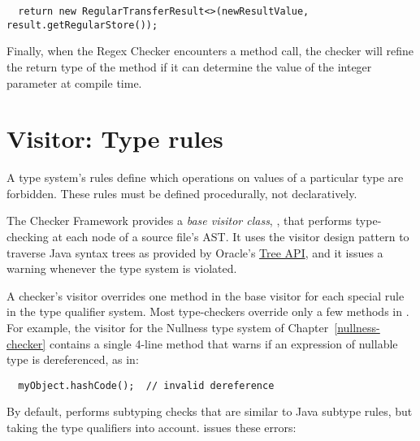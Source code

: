 \begin{enumerate}
\begin{smaller}
\begin{Verbatim}
  return new RegularTransferResult<>(newResultValue, result.getRegularStore());
\end{Verbatim}
\end{smaller}

Finally, when the Regex Checker encounters a  method
call, the checker will refine the return type of the method if it can determine
the value of the integer parameter at compile time.

\end{enumerate}


\section{Visitor: Type rules\label{extending-visitor}}

A type system's rules define which operations on values of a
particular type are forbidden.
These rules must be defined procedurally, not declaratively.

The Checker Framework provides a \textit{base visitor class},
, that performs type-checking at each node of a
source file's AST\@.  It uses the visitor design pattern to traverse
Java syntax trees as provided by Oracle's
\href{http://docs.oracle.com/javase/8/docs/jdk/api/javac/tree/}{Tree
API},
and it issues a warning whenever the type system is violated.

A checker's visitor overrides one method in the base visitor for each special
rule in the type qualifier system.  Most type-checkers
override only a few methods in .  For example, the
visitor for the Nullness type system of Chapter~\ref{nullness-checker}
contains a single 4-line method that warns if an expression of nullable type
is dereferenced, as in:
\begin{Verbatim}
  myObject.hashCode();  // invalid dereference
\end{Verbatim}



By default,  performs subtyping checks that are
similar to Java subtype rules, but taking the type qualifiers into account.
 issues these errors:

